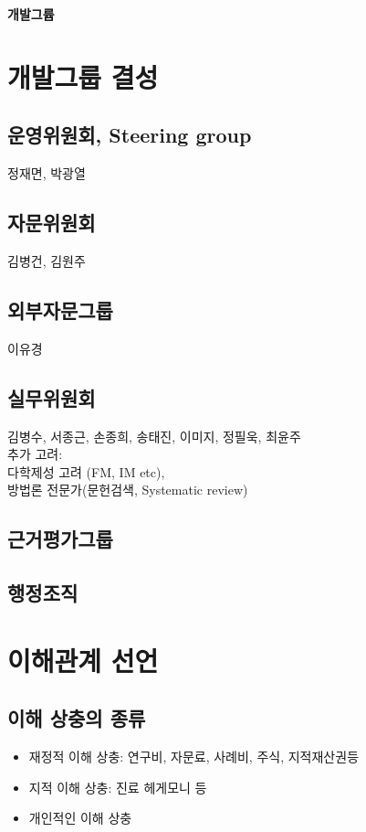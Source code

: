 \documentclass{paper}
\begin{document}
\Large \textbf{개발그륩} \normalsize

\section{개발그룹 결성}
\subsection{운영위원회, Steering group}
정재면, 박광열

\subsection{자문위원회}
김병건, 김원주

\subsection{외부자문그룹}
이유경

\subsection{실무위원회}
김병수, 서종근, 손종희, 송태진, 이미지, 정필욱, 최윤주\\[5ex]
추가 고려: \\
다학제성 고려 (FM, IM etc), \\
방법론 전문가(문헌검색, Systematic review)

\subsection{근거평가그룹}

\subsection{행정조직}

\vspace{30pt}
\section{이해관계 선언}

\subsection{이해 상충의 종류}
\begin{itemize}
	\item 재정적 이해  상충: 연구비, 자문료, 사례비, 주식, 지적재산권등
	\item 지적 이해 상충: 진료 헤게모니 등 
	\item 개인적인 이해 상충
\end{itemize}
\end{document}
